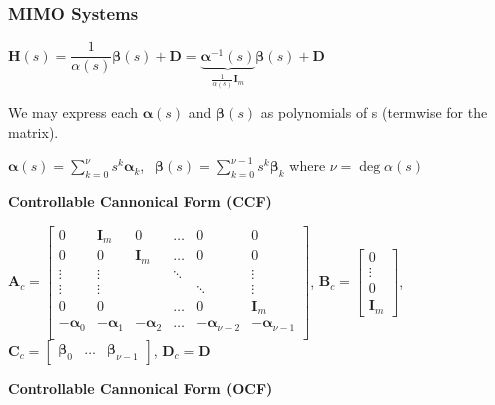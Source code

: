 \documentclass[11pt]{article}
\begin{document}
  \pagebreak

  \subsubsection{MIMO Systems}

  \(\bm{H}(s) = \dfrac{1}{\alpha(s)}\bm{\beta}(s) + \bm{D} =
  \underbrace{\bm{\alpha}^{-1}(s)}_{\frac{1}{\alpha(s)}\bm{I}_m}\bm{\beta}(s) + \bm{D}\)

  We may express each \(\bm{\alpha}(s)\) and \(\bm{\beta}(s)\) as polynomials of s
  (termwise for the matrix).

  \(\bm{\alpha}(s) = \displaystyle \sum_{k = 0}^{\nu} s^k\bm{\alpha}_k\),
  \(\ \ \bm{\beta}(s) = \displaystyle \sum_{k = 0}^{\nu - 1} s^k\bm{\beta}_k\) where \(\nu = \deg{\alpha(s)}\)

  \textbf{Controllable Cannonical Form (CCF)}

  \vspace{12pt}

  \(\bm{A}_c =
  \begin{bmatrix}
    0 & \bm{I}_m & 0 & \dots & 0 & 0 \\
    0 & 0 & \bm{I}_m & \dots & 0 & 0 \\
    \vdots & \vdots & & \ddots & & \vdots \\
    \vdots & \vdots & & & \ddots & \vdots \\
    0 & 0 & & \dots & 0 & \bm{I}_m \\
    -\bm{\alpha}_0 & -\bm{\alpha}_1 & -\bm{\alpha}_2 & \dots & -\bm{\alpha}_{\nu - 2} & -\bm{\alpha}_{\nu - 1} \\
  \end{bmatrix}\),
  \(\bm{B}_c =
  \begin{bmatrix}
     0 \\
     \vdots \\
     0 \\
     \bm{I}_m
  \end{bmatrix}\),
  \(\bm{C}_c = \begin{bmatrix} \bm{\beta}_0 & \dots & \bm{\beta}_{\nu - 1}\end{bmatrix}\),
  \(\bm{D}_c = \bm{D}\)

  \textbf{Controllable Cannonical Form (OCF)}

  \vspace{12pt}
\end{document}

